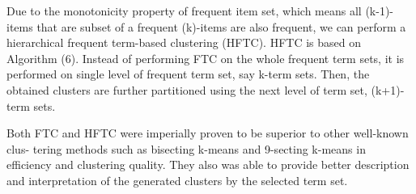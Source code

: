 \documentclass{VUMIFInfKursinis}
\begin{document}
			Due to the monotonicity property of frequent item set, which means all (k-1)-items that are subset of a frequent (k)-items are also frequent, we can perform a hierarchical frequent term-based clustering (HFTC). HFTC is based on Algorithm (6). Instead of performing FTC on the whole frequent term sets, it is performed on single level of frequent term set, say k-term sets. Then, the obtained clusters are further partitioned using the next level of term set, (k+1)-term sets.

			Both FTC and HFTC were imperially proven to be superior to other well-known clus- tering methods such as bisecting k-means and 9-secting k-means in efficiency and clustering quality. They also was able to provide better description and interpretation of the generated clusters by the selected term set.
\end{document}
